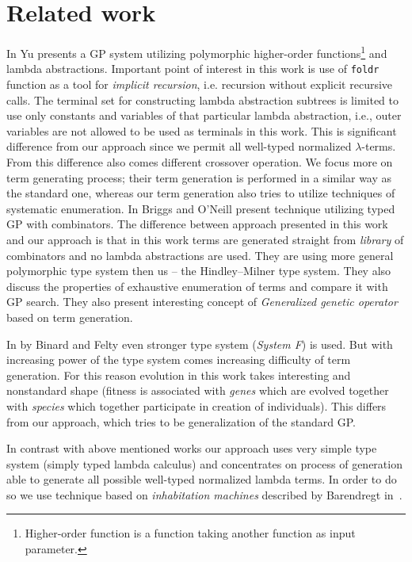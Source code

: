 \documentclass{article}
\newcommand{\lterms}{$\lambda$-terms\xspace}
\newcommand{\ro}[1]{{\color{blue} #1}}
\begin{document}
\section{Related work}
\label{related}

\ro{
In \cite{yu01} Yu presents a GP system utilizing
polymorphic higher-order functions\footnote{Higher-order 
function is a function taking another function as 
input parameter.} and lambda abstractions.
Important point of interest in this work is use of
\texttt{foldr} function as a tool for \textit{implicit recursion},
i.e. recursion without explicit recursive calls. 
The terminal set for constructing lambda abstraction subtrees 
is limited to use only constants and variables of that particular
lambda abstraction, i.e., outer variables are not allowed to be used
as terminals in this work. This is significant difference from our approach 
since we permit all well-typed normalized \lterms. From this difference also
comes different crossover operation. We focus more on term generating process; 
their term generation is performed in a similar way as the standard one, 
whereas our term generation also tries to utilize techniques of systematic enumeration. 
}
In \cite{kes} Briggs and O’Neill present technique 
utilizing typed GP with combinators.
The difference between approach presented in this work
and our approach is that in this work terms are generated
straight from \textit{library} of combinators and no lambda abstractions
are used. They are using more general polymorphic type system then us
-- the Hindley–Milner type system. They also discuss the 
properties of exhaustive enumeration of terms and compare it with GP search.  
They also present interesting concept of \textit{Generalized
genetic operator} based on term generation. 

In \cite{binard2008genetic} by Binard and Felty even 
stronger type system (\textit{System F}) is used.  
But with increasing power of the type system comes increasing difficulty of term generation.
For this reason evolution in this work takes interesting and nonstandard shape 
(fitness is associated with \textit{genes} which are evolved together with \textit{species}
which together participate in creation of individuals).
This differs from our approach, which tries to be generalization of
the standard GP\cite{koza92}.

In contrast with above mentioned works our approach uses very simple type system 
(simply typed lambda calculus) and concentrates on process of generation  
able to generate all possible well-typed normalized lambda terms. In order to do
so we use technique based on \textit{inhabitation machines} 
described by Barendregt in~\cite{barendregt10}.    
\end{document}
